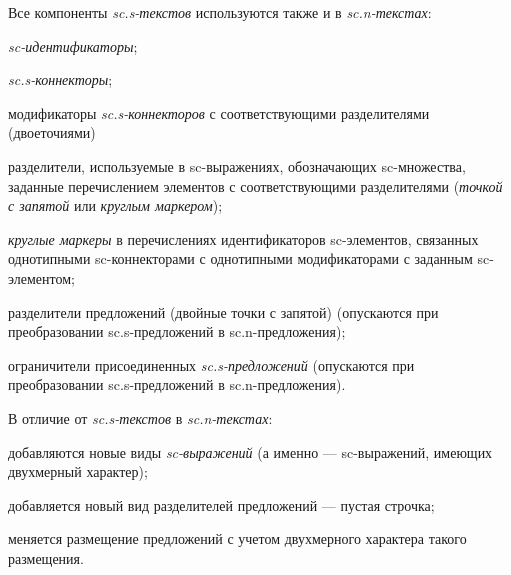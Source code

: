 \begin{SCn}
\begin{scnhaselementset}
\end{scnhaselementset}
\end{SCn}

Все компоненты \textit{sc.s-текстов} используются также и в \textit{sc.n-текстах}:
\begin{textitemize}
	\item \textit{sc-идентификаторы};
	\item \textit{sc.s-коннекторы};
	\item модификаторы \textit{sc.s-коннекторов} с соответствующими разделителями (двоеточиями)
	\item разделители, используемые в sc-выражениях, обозначающих sc-множества, заданные перечислением элементов с соответствующими разделителями (\textit{точкой с запятой} или \textit{круглым маркером});
	\item \textit{круглые маркеры} в перечислениях идентификаторов \mbox{sc-элементов}, связанных однотипными sc-коннекторами с однотипными модификаторами с заданным sc-элементом;
	\item разделители предложений (двойные точки с запятой) (опускаются при преобразовании \mbox{sc.s-предложений} в \mbox{sc.n-предложения});
	\item ограничители присоединенных \textit{sc.s-предложений} (опускаются при преобразовании sc.s-предложений в sc.n-предложения).
\end{textitemize}

В отличие от \textit{sc.s-текстов} в \textit{sc.n-текстах}:
\begin{textitemize}
	\item добавляются новые виды \textit{sc-выражений} (а именно --- sc-выражений, имеющих двухмерный характер);
	\item добавляется новый вид разделителей предложений --- пустая строчка;
	\item меняется размещение предложений с учетом двухмерного характера такого размещения.
\end{textitemize}

